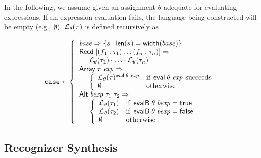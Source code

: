 \begin{definition}

 In the following, we assume given an assignment $\theta$ adequate for
 evaluating expressions. If an expression evaluation fails, the
 language being constructed will be empty (e.g., $\emptyset$). ${\mathcal L}_{\theta}({\tau})$ is defined recursively as

\[
\mathtt{case}\; \tau\
 \left\{
 \begin{array}{l}
 \mathit{base} \Rightarrow \{ {s \mid \mathsf{len}(s) = \mathsf{width}(base)} \} \\
 \mathsf{Recd}\; [(f_1 : \tau_1) \ldots (f_n : \tau_n)]
      \Rightarrow \\
      \hspace*{5mm} {\mathcal L}_{\theta}({\tau_1}) \cdot \ldots \cdot {\mathcal L}_{\theta}({\tau_n})
\\
 \mathsf{Array}\; \tau \; \mathit{exp} \Rightarrow  \\
  \hspace*{5mm}
 \left\{
 \begin{array}{ll}
    {\mathcal L}_{\theta}({\tau})^{\mathsf{eval}\;\theta\;\mathit{exp}} &
       \mathrm{if}\ \mathsf{eval}\;\theta\;\mathit{exp}\ \mathrm{succeeds} \\
    \emptyset & \text{otherwise}
 \end{array}
 \right.
\\
 \mathsf{Alt}\; \mathit{bexp}\;\tau_1\; \tau_2 \Rightarrow \\
  \hspace*{5mm}
 \left\{
 \begin{array}{ll}
    {\mathcal L}_{\theta}({\tau_1}) & \mathrm{if}\ \mathsf{evalB}\;\theta\;\mathit{bexp} = \mathsf{true} \\
    {\mathcal L}_{\theta}({\tau_2}) & \mathrm{if}\ \mathsf{evalB}\;\theta\;\mathit{bexp} = \mathsf{false} \\
    \emptyset          & \text{otherwise}
 \end{array}
 \right.
 \\
\end{array}
 \right.
\]
\end{definition}

\subsection{Recognizer Synthesis}

